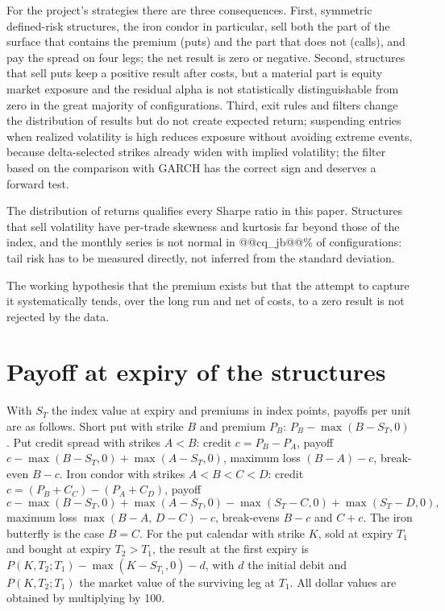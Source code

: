 \documentclass[11pt,a4paper]{article}
\begin{document}
For the project's strategies there are three consequences. First, symmetric defined-risk structures, the iron condor in particular, sell both the part of the surface that contains the premium (puts) and the part that does not (calls), and pay the spread on four legs; the net result is zero or negative. Second, structures that sell puts keep a positive result after costs, but a material part is equity market exposure and the residual alpha is not statistically distinguishable from zero in the great majority of configurations. Third, exit rules and filters change the distribution of results but do not create expected return; suspending entries when realized volatility is high reduces exposure without avoiding extreme events, because delta-selected strikes already widen with implied volatility; the filter based on the comparison with GARCH has the correct sign and deserves a forward test.

The distribution of returns qualifies every Sharpe ratio in this paper. Structures that sell volatility have per-trade skewness and kurtosis far beyond those of the index, and the monthly series is not normal in @@cq_jb@@\% of configurations: tail risk has to be measured directly, not inferred from the standard deviation.

The working hypothesis that the premium exists but that the attempt to capture it systematically tends, over the long run and net of costs, to a zero result is not rejected by the data.

\appendix
\section{Payoff at expiry of the structures}\label{app:payoff}

With $S_T$ the index value at expiry and premiums in index points, payoffs per unit are as follows. Short put with strike $B$ and premium $P_B$: $P_B - \max(B-S_T,0)$. Put credit spread with strikes $A<B$: credit $c=P_B-P_A$, payoff $c - \max(B-S_T,0) + \max(A-S_T,0)$, maximum loss $(B-A)-c$, break-even $B-c$. Iron condor with strikes $A<B<C<D$: credit $c=(P_B+C_C)-(P_A+C_D)$, payoff
\[
c - \max(B-S_T,0) + \max(A-S_T,0) - \max(S_T-C,0) + \max(S_T-D,0),
\]
maximum loss $\max(B-A,\,D-C)-c$, break-evens $B-c$ and $C+c$. The iron butterfly is the case $B=C$. For the put calendar with strike $K$, sold at expiry $T_1$ and bought at expiry $T_2>T_1$, the result at the first expiry is $P(K,T_2;T_1) - \max(K-S_{T_1},0) - d$, with $d$ the initial debit and $P(K,T_2;T_1)$ the market value of the surviving leg at $T_1$. All dollar values are obtained by multiplying by 100.
\end{document}
